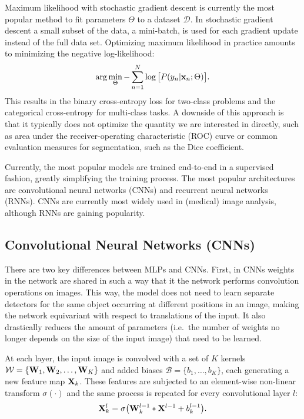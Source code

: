 \documentclass[final,a4paper,12pt,english]{UnicaPhdThesis3}
\begin{document}
Maximum likelihood with stochastic gradient descent is currently the most popular method to fit parameters $\Theta$ to a dataset $\mathcal{D}$. In stochastic gradient descent a small subset of the data, a mini-batch, is used for each gradient update instead of the full data set. Optimizing maximum likelihood in practice amounts to minimizing the negative log-likelihood:
\begin{equation}
\arg \min_{\Theta} - \sum^{N}_{n = 1} \log\big[ P(y_{n}| {\bf x}_{n}; \Theta) \big].
\end{equation}
This results in the binary cross-entropy loss for two-class problems and the categorical cross-entropy for multi-class tasks. A downside of this approach is that it typically does not optimize the quantity we are interested in directly, such as area under the receiver-operating characteristic (ROC) curve or common evaluation measures for segmentation, such as the Dice coefficient. 

Currently, the most popular models are trained end-to-end in a supervised fashion, greatly simplifying the training process. The most popular architectures are convolutional neural networks (CNNs) and recurrent neural networks (RNNs). CNNs are currently most widely used in (medical) image analysis, although RNNs are gaining popularity. 

\subsection{Convolutional Neural Networks (CNNs)}
There are two key differences between MLPs and CNNs. First, in CNNs weights in the network are shared in such a way that it the network performs convolution operations on images. This way, the model does not need to learn separate detectors for the same object occurring at different positions in an image, making the network equivariant with respect to translations of the input. It also drastically reduces the amount of parameters (i.e.\ the number of weights no longer depends on the size of the input image) that need to be learned. 

At each layer, the input image is convolved with a set of $K$ kernels  $\mathcal{W} = \{ {\bf W}_{1}, {\bf W}_{2}, \ldots, {\bf W}_{K} \} $ and added biases $\mathcal{B} = \{b_{1}, \ldots, b_{K}\}$, each generating a new feature map ${\bf X}_{k}$. These features are subjected to an element-wise non-linear transform $\sigma(\cdot)$ and the same process is repeated for every convolutional layer $l$:
\begin{equation}
\label{eq::mapping_cnn}
{\bf X}_{k}^{l} = \sigma\big( {\bf W}_{k}^{l -1} \ast {\bf X}^{l -1} + b_{k}^{l-1} \big).
\end{equation}
\end{document}
